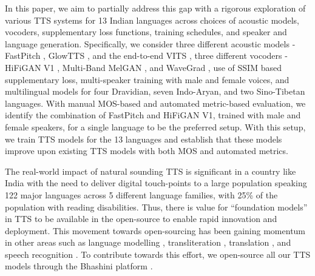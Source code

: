 \documentclass{article}
\begin{document}
In this paper, we aim to partially address this gap with a rigorous exploration of various TTS systems for 13 Indian languages across choices of acoustic models, vocoders, supplementary loss functions, training schedules, and speaker and language generation.
Specifically, we consider three different acoustic models - FastPitch \cite{lancucki2021fastpitch}, GlowTTS \cite{kim2020glow}, and the end-to-end VITS \cite{kim2021conditional}, three different vocoders - HiFiGAN V1 \cite{kong2020hifi}, Multi-Band MelGAN \cite{yang2021multi}, and WaveGrad \cite{chen2020wavegrad}, use of SSIM \cite{wang2004image} based supplementary loss, multi-speaker training with male and female voices, and multilingual models for four Dravidian, seven Indo-Aryan, and two Sino-Tibetan languages.
With manual MOS-based and automated metric-based evaluation, we identify the combination of FastPitch and HiFiGAN V1, trained with male and female speakers, for a single language to be the preferred setup.
With this setup, we train TTS models for the 13 languages and establish that these models improve upon existing TTS models with both MOS and automated metrics.


The real-world impact of natural sounding TTS is significant in a country like India with the need to deliver digital touch-points to a large population speaking 122 major languages across 5 different language families, with 25\% of the population with reading disabilities. 
Thus, there is value for ``foundation models'' \cite{bommasani2021opportunities} in TTS to be available in the open-source to enable rapid innovation and deployment.
This movement towards open-sourcing has been gaining momentum in other areas such as language modelling \cite{devlin2018bert, kakwani2020indicnlpsuite}, transliteration \cite{madhani2022aksharantar}, translation \cite{costa2022no}, and speech recognition \cite{javed2022towards}.
To contribute towards this effort, we open-source all our TTS models through the Bhashini platform \cite{bhashini}.
\end{document}
